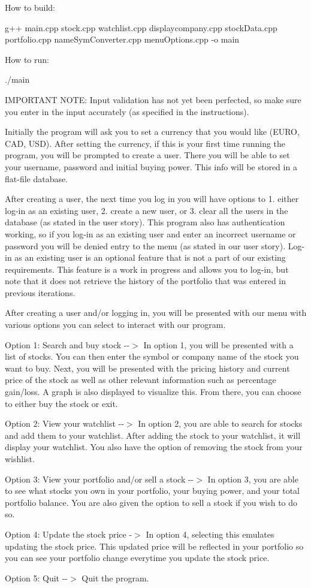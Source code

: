 How to build\+:

g++ main.\+cpp stock.\+cpp watchlist.\+cpp displaycompany.\+cpp stock\+Data.\+cpp portfolio.\+cpp name\+Sym\+Converter.\+cpp menu\+Options.\+cpp -\/o main

How to run\+:

./main

I\+M\+P\+O\+R\+T\+A\+NT N\+O\+TE\+: Input validation has not yet been perfected, so make sure you enter in the input accurately (as specified in the instructions).

Initially the program will ask you to set a currency that you would like (E\+U\+RO, C\+AD, U\+SD). After setting the currency, if this is your first time running the program, you will be prompted to create a user. There you will be able to set your username, password and initial buying power. This info will be stored in a flat-\/file database.

After creating a user, the next time you log in you will have options to 1. either log-\/in as an existing user, 2. create a new user, or 3. clear all the users in the database (as stated in the user story). This program also has authentication working, so if you log-\/in as an existing user and enter an incorrect username or password you will be denied entry to the menu (as stated in our user story). Log-\/in as an existing user is an optional feature that is not a part of our existing requirements. This feature is a work in progress and allows you to log-\/in, but note that it does not retrieve the history of the portfolio that was entered in previous iterations.

After creating a user and/or logging in, you will be presented with our menu with various options you can select to interact with our program.

Option 1\+: Search and buy stock -\/-\/$>$ In option 1, you will be presented with a list of stocks. You can then enter the symbol or company name of the stock you want to buy. Next, you will be presented with the pricing history and current price of the stock as well as other relevant information such as percentage gain/loss. A graph is also displayed to visualize this. From there, you can choose to either buy the stock or exit.

Option 2\+: View your watchlist -\/-\/$>$ In option 2, you are able to search for stocks and add them to your watchlist. After adding the stock to your watchlist, it will display your watchlist. You also have the option of removing the stock from your wishlist.

Option 3\+: View your portfolio and/or sell a stock -\/-\/$>$ In option 3, you are able to see what stocks you own in your portfolio, your buying power, and your total portfolio balance. You are also given the option to sell a stock if you wish to do so.

Option 4\+: Update the stock price -\/$>$ In option 4, selecting this emulates updating the stock price. This updated price will be reflected in your portfolio so you can see your portfolio change everytime you update the stock price.

Option 5\+: Quit -\/-\/$>$ Quit the program. 